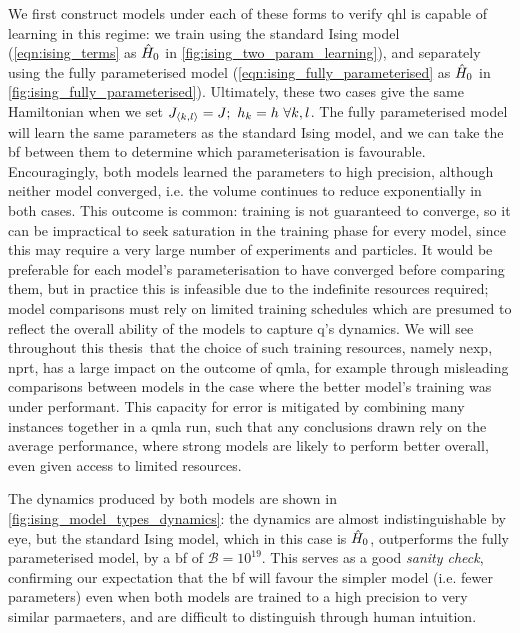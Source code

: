 We first construct models under each of these forms to verify \gls{qhl} is capable of learning in this regime:
    we train using the standard Ising model (\cref{eqn:ising_terms} as $\hat{H}_0$ in \cref{fig:ising_two_param_learning}),
    and separately using the fully parameterised model (\cref{eqn:ising_fully_parameterised} as $\hat{H}_0$ in \cref{fig:ising_fully_parameterised}).
Ultimately, these two cases give the same Hamiltonian when we set $J_{{ \langle k, l \rangle }} = J; \ h_k = h \ \forall k,l$.
The fully parameterised model will learn the same parameters as the standard Ising model,
    and we can take the \gls{bf} between them to determine which parameterisation is favourable.
Encouragingly, both models learned the parameters to high precision, although neither model converged,
    i.e. the \gls{volume} continues to reduce exponentially in both cases.
This outcome is common: training is not guaranteed to converge\footnotemark, 
    so it can be impractical to seek saturation in the training phase for every model, 
    since this may require a very large number of experiments and \glspl{particle}. 
It would be preferable for each model's parameterisation to have converged before comparing them, 
    but in practice this is infeasible due to the indefinite resources required; 
    model comparisons must rely on limited training schedules which are presumed to reflect the overall ability of 
    the models to capture \gls{q}'s dynamics. 
We will see throughout this thesis\footnotemark \ that the choice of such training resources, namely \gls{nexp}, \gls{nprt}, 
    has a large impact on the outcome of \gls{qmla}, for example through misleading comparisons between models 
    in the case where the better model's training was under performant. 
This capacity for error is mitigated by combining many \glspl{instance} together in 
    a \gls{qmla} \gls{run}, such that any conclusions drawn rely on the average performance, 
    where strong models are likely to perform better overall, even given access to limited resources. 
\par 

The dynamics produced by both models are shown in \cref{fig:ising_model_types_dynamics}:
    the dynamics are almost indistinguishable by eye, but the standard Ising model, 
    which in this case is $\hat{H}_0$, outperforms the fully parameterised model, 
    by a \gls{bf} of $\mathcal{B} = 10^{19}$.
This serves as a good \emph{sanity check}, confirming our expectation that 
    the \gls{bf} will favour the simpler model (i.e. fewer parameters) even when both models 
    are trained to a high precision to very similar parmaeters, and are difficult to distinguish through human intuition. 


